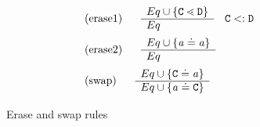 \begin{figure}
\begin{align*}
&\begin{tabular}[t]{ll}
      (erase1)  & $ 
      \begin{array}[c]{ll}
        \begin{array}[c]{l}
          Eq \cup \set{\type{C} \lessdot \type{D}}\\
          \hline
          Eq
        \end{array}
        & \type{C} <: \type{D}
      \end{array}$\\
          \end{tabular}\\
&\begin{tabular}[t]{ll}
      (erase2)  & $ 
      \begin{array}[c]{ll}
        \begin{array}[c]{l}
          Eq \cup \set{\tv{a} \doteq \tv{a}}\\
          \hline
          Eq
        \end{array}
      \end{array}$\\
          \end{tabular}\\
    &      \begin{tabular}[t]{ll}
       (swap) & $
            \begin{array}[c]{ll}
              \begin{array}[c]{l}
                Eq \cup \set{\type{C} \doteq \tv{a}}\\
                \hline
                Eq \cup \set{\tv{a} \doteq \type{C}}
              \end{array}
            \end{array}$
          \end{tabular}
\end{align*}
\caption{Erase and swap rules}\label{fig:fgjerase-rules}
\end{figure}


